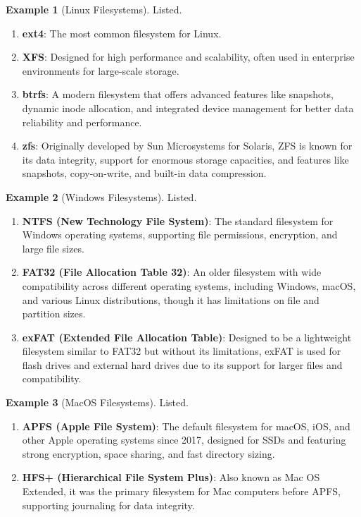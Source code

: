 \documentclass{article}
\theoremstyle{definition}
\newtheorem{example}{Example}[section]
\begin{document}
  \begin{example}[Linux Filesystems]
    Listed. 
    \begin{enumerate}
      \item \textbf{ext4}: The most common filesystem for Linux. 
      \item \textbf{XFS}: Designed for high performance and scalability, often used in enterprise environments for large-scale storage.
      \item \textbf{btrfs}: A modern filesystem that offers advanced features like snapshots, dynamic inode allocation, and integrated device management for better data reliability and performance. 
      \item \textbf{zfs}: Originally developed by Sun Microsystems for Solaris, ZFS is known for its data integrity, support for enormous storage capacities, and features like snapshots, copy-on-write, and built-in data compression.
    \end{enumerate}
  \end{example}

  \begin{example}[Windows Filesystems]
    Listed. 
    \begin{enumerate} 
      \item \textbf{NTFS (New Technology File System)}: The standard filesystem for Windows operating systems, supporting file permissions, encryption, and large file sizes.
      \item \textbf{FAT32 (File Allocation Table 32)}: An older filesystem with wide compatibility across different operating systems, including Windows, macOS, and various Linux distributions, though it has limitations on file and partition sizes.
      \item \textbf{exFAT (Extended File Allocation Table)}: Designed to be a lightweight filesystem similar to FAT32 but without its limitations, exFAT is used for flash drives and external hard drives due to its support for larger files and compatibility.
    \end{enumerate}
  \end{example}

  \begin{example}[MacOS Filesystems]
    Listed. 
    \begin{enumerate}
      \item \textbf{APFS (Apple File System)}: The default filesystem for macOS, iOS, and other Apple operating systems since 2017, designed for SSDs and featuring strong encryption, space sharing, and fast directory sizing.
      \item \textbf{HFS+ (Hierarchical File System Plus)}: Also known as Mac OS Extended, it was the primary filesystem for Mac computers before APFS, supporting journaling for data integrity.
    \end{enumerate}
  \end{example}
\end{document}
